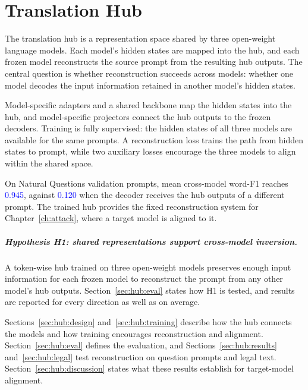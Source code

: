 \providecommand{\vf}[1]{\textcolor{blue}{#1}}
\providecommand{\hit}[1]{\textcolor[RGB]{0,115,90}{#1}}
\providecommand{\miss}[1]{\textcolor[RGB]{196,78,0}{\textbf{#1}}}

\chapter{Translation Hub}\label{ch:hub}

The translation hub is a representation space shared by three open-weight language models.
Each model’s hidden states are mapped into the hub, and each frozen model reconstructs the source prompt from the resulting hub outputs.
The central question is whether reconstruction succeeds across models: whether one model decodes the input information retained in another model’s hidden states.

Model-specific adapters and a shared backbone map the hidden states into the hub, and model-specific projectors connect the hub outputs to the frozen decoders.
Training is fully supervised: the hidden states of all three models are available for the same prompts.
A reconstruction loss trains the path from hidden states to prompt, while two auxiliary losses encourage the three models to align within the shared space.

On Natural Questions validation prompts, mean cross-model word-F1 reaches \vf{0.945}, against \vf{0.120} when the decoder receives the hub outputs of a different prompt. %
The trained hub provides the fixed reconstruction system for Chapter~\ref{ch:attack}, where a target model is aligned to it.

\paragraph{Hypothesis H1: shared representations support cross-model inversion.} A token-wise hub trained on three open-weight models preserves enough input information for each frozen model to reconstruct the prompt from any other model's hub outputs.
Section~\ref{sec:hub:eval} states how H1 is tested, and results are reported for every direction as well as on average.

Sections~\ref{sec:hub:design} and~\ref{sec:hub:training} describe how the hub connects the models and how training encourages reconstruction and alignment.
Section~\ref{sec:hub:eval} defines the evaluation, and Sections~\ref{sec:hub:results} and~\ref{sec:hub:legal} test reconstruction on question prompts and legal text.
Section~\ref{sec:hub:discussion} states what these results establish for target-model alignment.

